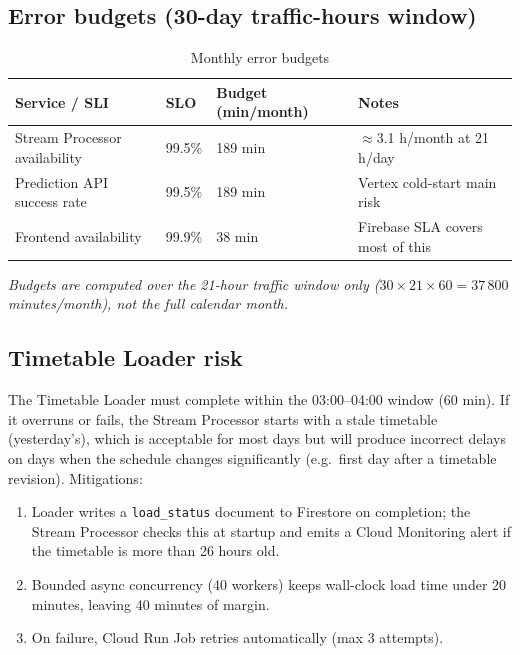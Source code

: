 \documentclass[11pt,a4paper]{article}
\newcommand{\hd}[1]{\textbf{\small #1}}
\begin{document}
\subsection{Error budgets (30-day traffic-hours window)}

\begin{table}[H]
\centering
\caption{Monthly error budgets}
\renewcommand{\arraystretch}{1.38}
\begin{tabularx}{\linewidth}{L{3.6cm} C{2.0cm} C{2.4cm} X}
\toprule
\hd{Service / SLI} & \hd{SLO} & \hd{Budget (min/month)} & \hd{Notes} \\
\midrule
{}
Stream Processor availability & 99.5\% & 189 min & $\approx$3.1 h/month at 21 h/day \\
Prediction API success rate & 99.5\% & 189 min & Vertex cold-start main risk \\
Frontend availability & 99.9\% & 38 min & Firebase SLA covers most of this \\
\bottomrule
\end{tabularx}
\end{table}

\noindent\small\textit{Budgets are computed over the 21-hour traffic window only
($30 \times 21 \times 60 = 37\,800$ minutes/month), not the full calendar month.}

\normalsize

\subsection{Timetable Loader risk}

The Timetable Loader must complete within the 03:00--04:00 window (60 min).
If it overruns or fails, the Stream Processor starts with a stale timetable
(yesterday's), which is acceptable for most days but will produce incorrect
delays on days when the schedule changes significantly (e.g.\ first day after
a timetable revision). Mitigations:

\begin{enumerate}[itemsep=2pt]
  \item Loader writes a \texttt{load\_status} document to Firestore on
    completion; the Stream Processor checks this at startup and emits a
    Cloud Monitoring alert if the timetable is more than 26 hours old.
  \item Bounded async concurrency (40 workers) keeps wall-clock load time
    under 20 minutes, leaving 40 minutes of margin.
  \item On failure, Cloud Run Job retries automatically (max 3 attempts).
\end{enumerate}
\end{document}

